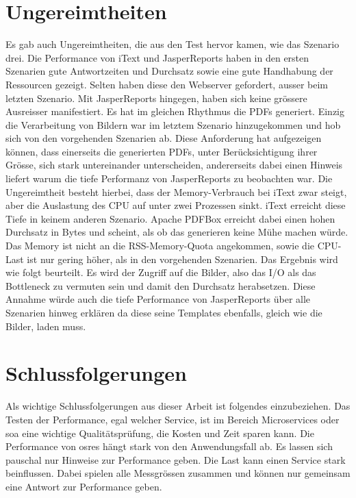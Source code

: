 \documentclass[main.tex]{subfiles}
\begin{document}
\section{Ungereimtheiten}
Es gab auch Ungereimtheiten, die aus den Test hervor kamen, wie das Szenario drei. Die Performance von iText und JasperReports haben in den ersten Szenarien gute Antwortzeiten und Durchsatz sowie eine gute Handhabung der Ressourcen gezeigt. Selten haben diese den Webserver gefordert, ausser beim letzten Szenario. Mit JasperReports hingegen, haben sich keine grössere Ausreisser manifestiert. Es hat im gleichen Rhythmus die PDFs generiert. Einzig die Verarbeitung von Bildern war im letztem Szenario hinzugekommen und hob sich von den vorgehenden Szenarien ab. Diese Anforderung hat aufgezeigen können, dass einerseits die generierten PDFs, unter Berücksichtigung ihrer Grösse, sich stark untereinander unterscheiden, andererseits dabei einen Hinweis liefert warum die tiefe Performanz von JasperReports zu beobachten war. Die Ungereimtheit besteht hierbei, dass der Memory-Verbrauch bei iText zwar steigt, aber die Auslastung des CPU auf unter zwei Prozessen sinkt. iText erreicht diese Tiefe in keinem anderen Szenario.  Apache PDFBox erreicht dabei einen hohen Durchsatz in Bytes und scheint, als ob das generieren keine Mühe machen würde. Das Memory ist nicht an die RSS-Memory-Quota angekommen, sowie die CPU-Last ist nur gering höher, als in den vorgehenden Szenarien.  Das Ergebnis wird wie folgt beurteilt. Es wird der Zugriff auf die Bilder, also das I/O als das Bottleneck zu vermuten sein und damit den Durchsatz herabsetzen. Diese Annahme würde auch die tiefe Performance von JasperReports über alle Szenarien hinweg erklären da diese seine Templates ebenfalls, gleich wie die Bilder, laden muss.
\section{Schlussfolgerungen}
Als wichtige Schlussfolgerungen aus dieser Arbeit ist folgendes einzubeziehen. Das Testen der Performance, egal welcher Service, ist im Bereich Microservices oder \acrshort{soa} eine wichtige Qualitätsprüfung, die Kosten und Zeit sparen kann. Die Performance von \acrshort{osre}s hängt stark von den Anwendungsfall ab. Es lassen sich pauschal nur Hinweise zur Performance geben. Die Last kann einen Service stark beinflussen. Dabei spielen alle Messgrössen zusammen und können nur gemeinsam eine Antwort zur Performance geben.  
\end{document}
